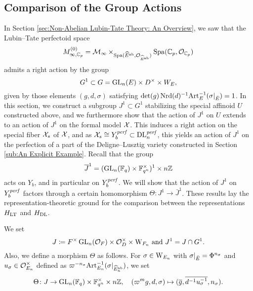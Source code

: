 \documentclass[../main.tex]{subfiles}
\begin{document}
\subsection{Comparison of the Group Actions} %
\label{sub:Proof of Proposition}
In Section \ref{sec:Non-Abelian Lubin-Tate Theory: An Overview}, we saw that
the Lubin--Tate perfectoid space 
$$M_{\infty, \mathbb{C}_p}^{(0)} = \mathcal{M}_{\infty} \times_{\operatorname{Spa}(\widehat E^{\mathrm{ab}}, \mathcal{O}_{\widehat
E^{\mathrm{ab}}})} \operatorname{Spa}({\mathbb{C}_p}, \mathcal{O}_{\mathbb{C}_p})$$ 
admits a right action by the group
\begin{equation*}
  G^1 \subset G = \operatorname{GL}_n(E) \times D^\times \times W_E,
\end{equation*}
given by those elements $(g,d,\sigma)$ satisfying $\det(g) \operatorname{Nrd}(d)^{-1} \mathrm{Art}_E^{-1}(\sigma|_{\breve {E}}) = 1$.
In this section, we construct a subgroup $J^1 \subset G^1$ stabilizing the
special affinoid $U$ constructed above, and we furthermore show that 
the action of $J^1$ on $U$ extends to an action of $J^1$ on the formal model
$\mathcal{X}$. This induces a right action on the special fiber
$\mathcal{X}_s$ of $\mathcal{X}$, and as $\mathcal{X}_s \cong Y_b^{\mathit{perf}} \subset \mathrm{DL}_n^{\mathit{perf}}$, this
yields an action of $J^1$ on the perfection of a part of the Deligne--Lusztig
variety constructed in Section \ref{sub:An Explicit Example}. Recall that the group 
\begin{equation*}
  \overline J^1 = (\operatorname{GL}_n(\mathbb{F}_q) \times \mathbb{F}_{q^n}^\times)^1 \times n\mathbb{Z}
\end{equation*}
acts on $Y_b$, and in particular on 
$Y_b^{\mathit{perf}}$. We will show that the action of $J^1$ on $Y_b^{\mathit{perf}}$
factors through a certain homomorphism $\Theta: J^1 \to \bar J^1$. These
results lay the representation-theoretic ground for the comparison between the
representations $H_{\mathrm{LT}}$ and $H_\mathrm{DL}$.

We set 
\begin{equation} \label{eq:defJandJ1}
  J \coloneqq F^\times \operatorname{GL}_n(\mathcal{O}_F) \times \mathcal{O}_D^\times \times \mathrm W_{F_n}
  \text{ and } J^1 = J \cap G^1.
\end{equation}
Also, we define a morphism $\Theta$ as follows. For $\sigma \in \mathrm W_{E_n}$ with
$\sigma|_{\breve {E}} = \Phi^{n_\sigma}$ and $u_\sigma \in \mathcal{O}_{E_n}^\times$ defined as
$\varpi^{-n_\sigma} \mathrm{Art}^{-1}_{E_n}(\sigma|_{\widehat E_n^{\mathrm{ab}}})$, we set
\begin{equation*}
  \Theta \colon J \to \operatorname{GL}_n(\mathbb{F}_q) \times \mathbb{F}_{q^n}^\times \times {n\mathbb{Z}}, \quad
  (\varpi^m g,d,\sigma) \mapsto (\overline g, \overline {d^{-1}u_\sigma^{-1}}, n_\sigma).
\end{equation*}
\end{document}
